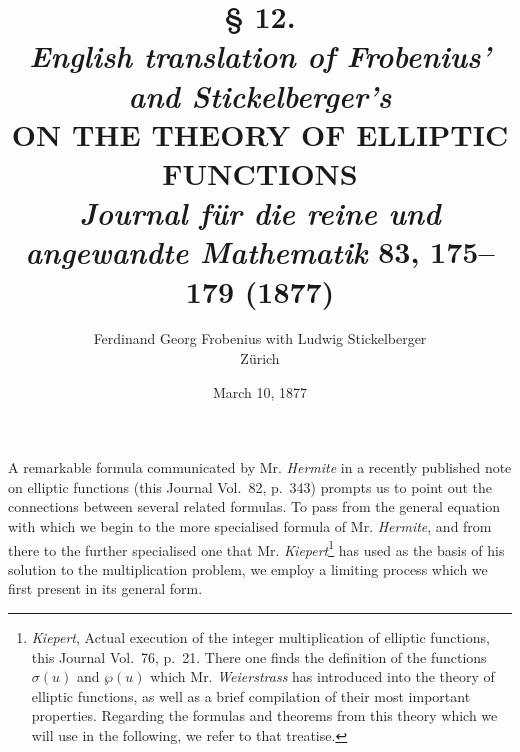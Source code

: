 \documentclass[12pt]{article}
\title{ § 12.\\
    {\small\textit{English translation of Frobenius' and Stickelberger's}} \\[0.5em] 
    \MakeUppercase{On the Theory of Elliptic Functions}
    \\[0.5em] {\small \textit{Journal für die reine und angewandte Mathematik} 83, 175--179 (1877)}
    }
\author{Ferdinand Georg Frobenius with Ludwig Stickelberger \\ Zürich }
\date{March 10, 1877}
\begin{document}
\maketitle

\medskip

A remarkable formula communicated by Mr. \textit{Hermite} in a recently published note on elliptic functions (this Journal Vol.~82, p.~343) prompts us to point out the connections between several related formulas. 
To pass from the general equation with which we begin to the more specialised formula of Mr. \textit{Hermite}, and from there to the further specialised one that Mr. \textit{Kiepert}\footnote{\textit{Kiepert}, Actual execution of the integer multiplication of elliptic functions, this Journal Vol.~76, p.~21. There one finds the definition of the functions $\sigma(u)$ and $\wp(u)$ which Mr. \textit{Weierstrass} has introduced into the theory of elliptic functions, as well as a brief compilation of their most important properties. Regarding the formulas and theorems from this theory which we will use in the following, we refer to that treatise.} has used as the basis of his solution to the multiplication problem, we employ a limiting process which we first present in its general form.
\end{document}

